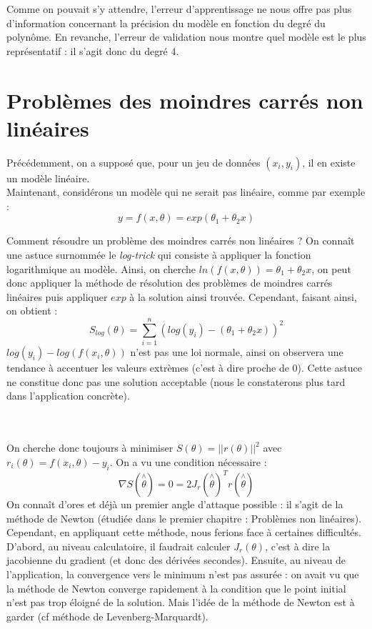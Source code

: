 \documentclass[a4paper,10pt]{report}
\begin{document}
Comme on pouvait s'y attendre, l'erreur d'apprentissage ne nous offre pas plus d'information concernant la précision du modèle en fonction du degré du polynôme. En revanche, l'erreur de validation nous montre quel modèle est le plus représentatif : il s'agit donc du degré 4.


\section{Problèmes des moindres carrés non linéaires}
Précédemment, on a supposé que, pour un jeu de données $(x_i,y_i)$, il en existe un modèle linéaire.\\
Maintenant, considérons un modèle qui ne serait pas linéaire, comme par exemple :
\abovedisplayskip=0mm
\begin{displaymath}
y=f(x,\theta) = exp(\theta_1 + \theta_2x)
\end{displaymath}

Comment résoudre un problème des moindres carrés non linéaires ? On connaît une astuce surnommée le \textit{log-trick} qui consiste à appliquer la fonction logarithmique au modèle. Ainsi, on cherche $ln(f(x,\theta))=\theta_1 + \theta_2x$, on peut donc appliquer la méthode de résolution des problèmes de moindres carrés linéaires puis appliquer $exp$ à la solution ainsi trouvée. Cependant, faisant ainsi, on obtient :
\abovedisplayskip=0mm
\begin{displaymath}
S_{log}(\theta)=\sum \limits_{i=1}^n (log(y_i)-(\theta_1+\theta_2x))^2
\end{displaymath}
$log(y_i)-log(f(x_i,\theta))$ n'est pas une loi normale, ainsi on observera une tendance à accentuer les valeurs extrèmes (c'est à dire proche de 0). Cette astuce ne constitue donc pas une solution acceptable (nous le constaterons plus tard dans l'application concrète). \\ \\\

On cherche donc toujours à minimiser $S(\theta) = ||r(\theta)||^2$ avec $r_i(\theta)=f(x_i,\theta)-y_i$. On a vu une condition nécessaire : 
\abovedisplayskip=0mm
\begin{displaymath}
\nabla S(\overset{\wedge}{\theta})=0=2J_r(\overset{\wedge}{\theta})^Tr(\overset{\wedge}{\theta})
\end{displaymath}
On connaît d'ores et déjà un premier angle d'attaque possible : il s'agit de la méthode de Newton (étudiée dans le premier chapitre : Problèmes non linéaires). Cependant, en appliquant cette méthode, nous ferions face à certaines difficultés. D'abord, au niveau calculatoire, il faudrait calculer $J_r(\theta)$, c'est à dire la jacobienne du gradient (et donc des dérivées secondes). Ensuite, au niveau de l'application, la convergence vers le minimum n'est pas assurée : on avait vu que la méthode de Newton converge rapidement à la condition que le point initial n'est pas trop éloigné de la solution. Mais l'idée de la méthode de Newton est à garder (cf méthode de Levenberg-Marquardt).
\end{document}
